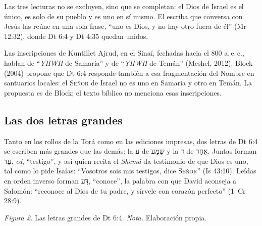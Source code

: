 \documentclass[11pt,letterpaper]{article}
\newcommand{\heb}[1]{\mbox{\foreignlanguage{hebrew}{#1}}}
\newcommand{\SENOR}{\textsc{Señor}}
\begin{document}
Las tres lecturas no se excluyen, sino que se completan: el Dios de Israel es el único, es solo de su pueblo y es uno en sí mismo. El escriba que conversa con Jesús las reúne en una sola frase, ``uno es Dios, y no hay otro fuera de él'' (Mr 12:32), donde Dt 6:4 y Dt 4:35 quedan unidos.

\begin{nota}[Precisión]
Las inscripciones de Kuntillet Ajrud, en el Sinaí, fechadas hacia el 800 a.\,e.\,c., hablan de ``\emph{YHWH} de Samaria'' y de ``\emph{YHWH} de Temán'' (Meshel, 2012). Block (2004) propone que Dt 6:4 responde también a esa fragmentación del Nombre en santuarios locales: el \SENOR{} de Israel no es uno en Samaria y otro en Temán. La propuesta es de Block; el texto bíblico no menciona esas inscripciones.
\end{nota}

\subsection{Las dos letras grandes}
Tanto en los rollos de la Torá como en las ediciones impresas, dos letras de Dt 6:4 se escriben más grandes que las demás: la \heb{ע} de \heb{שְׁמַע} y la \heb{ד} de \heb{אֶחָד}. Juntas forman \heb{עֵד}, \emph{ed}, ``testigo'', y así quien recita el \emph{Shemá} da testimonio de que Dios es uno, tal como lo pide Isaías: ``Vosotros sois mis testigos, dice \SENOR'' (Is 43:10). Leídas en orden inverso forman \heb{דַּע}, ``conoce'', la palabra con que David aconseja a Salomón: ``reconoce al Dios de tu padre, y sírvele con corazón perfecto'' (1~Cr 28:9).

\begin{center}
\par
{\footnotesize\color{gris}\textit{Figura 2.} Las letras grandes de Dt 6:4. \textit{Nota.} Elaboración propia.}
\end{center}
\end{document}
